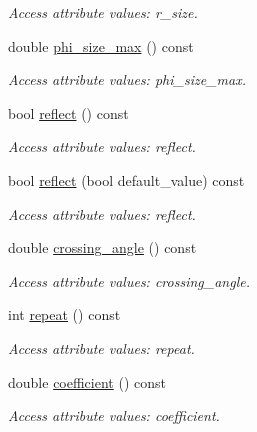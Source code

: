 \begin{DoxyCompactItemize}
\begin{DoxyCompactList}\small\item\em Access attribute values: r\_\-size. \item\end{DoxyCompactList}\item 
double \hyperlink{struct_d_d4hep_1_1_x_m_l_1_1_dimension_a3aced51c654c8422a2717d4e71ebbcbc}{phi\_\-size\_\-max} () const 
\begin{DoxyCompactList}\small\item\em Access attribute values: phi\_\-size\_\-max. \item\end{DoxyCompactList}\item 
bool \hyperlink{struct_d_d4hep_1_1_x_m_l_1_1_dimension_ab9921b5efd0eae321bbf5f0c77261512}{reflect} () const 
\begin{DoxyCompactList}\small\item\em Access attribute values: reflect. \item\end{DoxyCompactList}\item 
bool \hyperlink{struct_d_d4hep_1_1_x_m_l_1_1_dimension_a31eb2535fb87f42a82736f186ebda481}{reflect} (bool default\_\-value) const 
\begin{DoxyCompactList}\small\item\em Access attribute values: reflect. \item\end{DoxyCompactList}\item 
double \hyperlink{struct_d_d4hep_1_1_x_m_l_1_1_dimension_a5286de18cc81598b8f64fe3c2cf9f54d}{crossing\_\-angle} () const 
\begin{DoxyCompactList}\small\item\em Access attribute values: crossing\_\-angle. \item\end{DoxyCompactList}\item 
int \hyperlink{struct_d_d4hep_1_1_x_m_l_1_1_dimension_a991123b4eceede70e79554112a07e1d4}{repeat} () const 
\begin{DoxyCompactList}\small\item\em Access attribute values: repeat. \item\end{DoxyCompactList}\item 
double \hyperlink{struct_d_d4hep_1_1_x_m_l_1_1_dimension_afa120850f82ff337fdd41797995a6d2a}{coefficient} () const 
\begin{DoxyCompactList}\small\item\em Access attribute values: coefficient. \item\end{DoxyCompactList}\item 

\end{DoxyCompactItemize}
